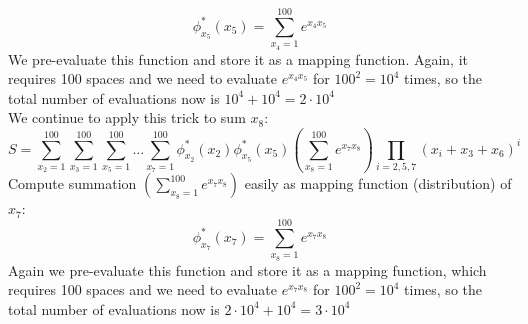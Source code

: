 \documentclass[11pt]{article}
\begin{document}
\begin{answertext}{24cm}{}
\begin{enumerate}
$$\phi^*_{x_5}(x_5) = \sum^{100}_{x_4 = 1} e^{x_4 x_5}$$
We pre-evaluate this function and store it as a mapping function. Again, it requires 100 spaces and we need to evaluate $e^{x_4 x_5}$ for $100^2=10^4$ times, so the total number of evaluations now is $10^4 + 10^4=2\cdot 10^4$\\
We continue to apply this trick to sum $x_8$:
$$S = \sum^{100}_{x_2 = 1} \sum^{100}_{x_3 = 1}\sum^{100}_{x_5 = 1}\dots\sum^{100}_{x_7 = 1}\phi^*_{x_2}(x_2) \phi^*_{x_5}(x_5) \left(\sum^{100}_{x_8 = 1} e^{x_7 x_8}\right)  \prod_{i=2,5,7} (x_i + x_3 + x_6)^i$$
Compute summation $\left(\sum^{100}_{x_8 = 1} e^{x_7 x_8}\right)$ easily as mapping function (distribution) of $x_7$:
$$\phi^*_{x_7}(x_7) = \sum^{100}_{x_8 = 1} e^{x_7 x_8}$$
Again we pre-evaluate this function and store it as a mapping function, which requires 100 spaces and we need to evaluate $e^{x_7 x_8}$ for $100^2=10^4$ times, so the total number of evaluations now is $2\cdot10^4 + 10^4=3\cdot 10^4$\\
\end{enumerate}
\end{answertext} 
\end{document}
